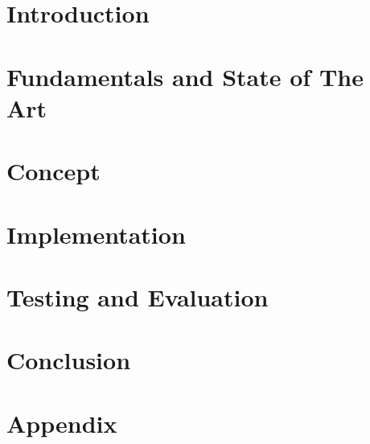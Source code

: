 \documentclass[10pt,twoside]{report}
\title{\thesisTitle}
\author{\thesisAuthor}
\date{\today}
\begin{document}




\tableofcontents{}

\chapter{Introduction}

\chapter{Fundamentals and State of The Art}



\chapter{Concept}

\chapter{Implementation}

\chapter{Testing and Evaluation}

\chapter{Conclusion}


\newpage
\appendix{}
\chapter{Appendix}


\listoffigures{}
\listoftables{}



\newpage
\printglossaries

\nocite{*}
\printbibliography{}

\newpage{}
\end{document}
